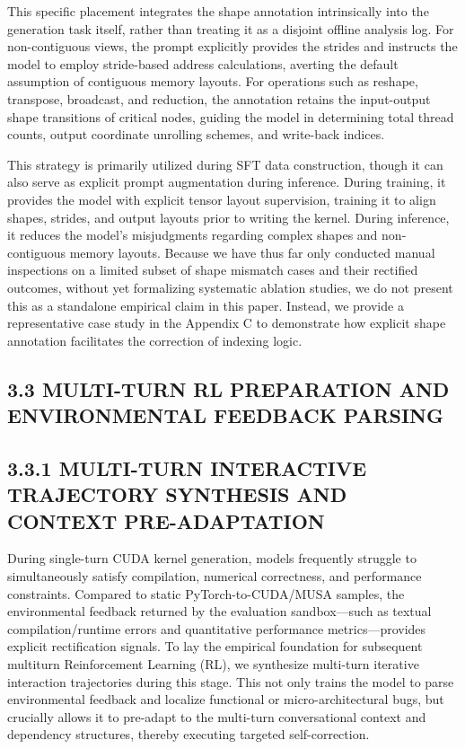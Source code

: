 \documentclass[
  10
]{article}
\begin{document}
This specific placement integrates the shape annotation intrinsically
into the generation task itself, rather than treating it as a disjoint
offline analysis log. For non-contiguous views, the prompt explicitly
provides the strides and instructs the model to employ stride-based
address calculations, averting the default assumption of contiguous
memory layouts. For operations such as reshape, transpose, broadcast,
and reduction, the annotation retains the input-output shape transitions
of critical nodes, guiding the model in determining total thread counts,
output coordinate unrolling schemes, and write-back indices.

This strategy is primarily utilized during SFT data construction, though
it can also serve as explicit prompt augmentation during inference.
During training, it provides the model with explicit tensor layout
supervision, training it to align shapes, strides, and output layouts
prior to writing the kernel. During inference, it reduces the model's
misjudgments regarding complex shapes and non-contiguous memory layouts.
Because we have thus far only conducted manual inspections on a limited
subset of shape mismatch cases and their rectified outcomes, without yet
formalizing systematic ablation studies, we do not present this as a
standalone empirical claim in this paper. Instead, we provide a
representative case study in the Appendix C to demonstrate how explicit
shape annotation facilitates the correction of indexing logic.

\subsection{3.3 MULTI-TURN RL PREPARATION AND ENVIRONMENTAL FEEDBACK
PARSING}\label{multi-turn-rl-preparation-and-environmental-feedback-parsing}

\subsection{3.3.1 MULTI-TURN INTERACTIVE TRAJECTORY SYNTHESIS AND
CONTEXT
PRE-ADAPTATION}\label{multi-turn-interactive-trajectory-synthesis-and-context-pre-adaptation}

During single-turn CUDA kernel generation, models frequently struggle to
simultaneously satisfy compilation, numerical correctness, and
performance constraints. Compared to static PyTorch-to-CUDA/MUSA
samples, the environmental feedback returned by the evaluation
sandbox---such as textual compilation/runtime errors and quantitative
performance metrics---provides explicit rectification signals. To lay
the empirical foundation for subsequent multiturn Reinforcement Learning
(RL), we synthesize multi-turn iterative interaction trajectories during
this stage. This not only trains the model to parse environmental
feedback and localize functional or micro-architectural bugs, but
crucially allows it to pre-adapt to the multi-turn conversational
context and dependency structures, thereby executing targeted
self-correction.
\end{document}
